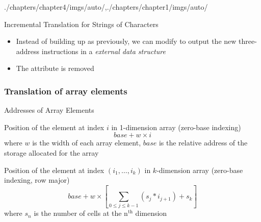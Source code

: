 \begin{graphicspathcontext}{{./chapters/chapter4/imgs/auto/},{./chapters/chapter1/imgs/auto/}}
\begin{bibunit}[apalike]
\begin{frame}{{Incremental Translation} for Strings of Characters}
	\begin{itemize}
	\item Instead of building up  as previously, we can modify  to output the new three-address instructions in a \emph{external data structure}
	\item The  attribute is removed
	\end{itemize}
	\vspace{1cm}
	\begin{footnotesize}
	\begin{sdd}
	\end{sdd}
	\end{footnotesize}
\end{frame}

\subsubsection{Translation of array elements}
\subsubsectiontableofcontentslide

\begin{frame}{Addresses of Array Elements}
	\smaller
	\vspace{.5cm}
	\begin{definitionblock}{Position of the element at index $i$ in 1-dimension array (zero-base indexing)}
		\[ base + w \times i \]
		where $w$ is the width of each array element, $base$ is the relative address of the storage allocated for the array
	\end{definitionblock}
	\begin{definitionblock}{Position of the element at index $(i_1,\dots,i_k)$ in $k$-dimension array (zero-base indexing, row major)}
		\[ base + w \times \left[ \sum_{0 \le j \le k-1} \left( s_j * i_{j+1} \right) + s_k \right] \]
		where $s_n$ is the number of cells at the n$^{\text{th}}$ dimension
	\end{definitionblock}
\end{frame}


\end{bibunit}
\end{graphicspathcontext}
